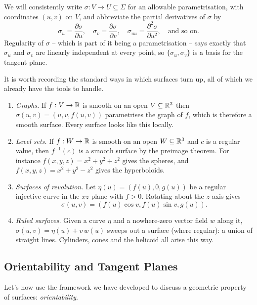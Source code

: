 \documentclass[a4paper]{scrartcl}
\begin{document}
We will consistently write $\sigma: V \rightarrow U \subseteq \Sigma$ for an allowable parametrisation, with coordinates $(u, v)$ on $V$, and abbreviate the partial derivatives of $\sigma$ by
$$
\sigma_u = \frac{\partial\sigma}{\partial u}, \quad \sigma_v = \frac{\partial\sigma}{\partial v}, \quad \sigma_{uu} = \frac{\partial^2 \sigma}{\partial u^2}, \quad \text{and so on.}
$$
Regularity of $\sigma$ -- which is part of it being a parametrisation -- says exactly that $\sigma_u$ and $\sigma_v$ are linearly independent at every point, so $\{\sigma_u, \sigma_v\}$ is a basis for the tangent plane.

It is worth recording the standard ways in which surfaces turn up, all of which we already have the tools to handle.

\begin{example}
    \begin{enumerate}[label=(\roman*)]
        \item \emph{Graphs.} If $f: V \rightarrow \mathbb{R}$ is smooth on an open $V\subseteq\mathbb{R}^2$ then $\sigma(u,v) = (u, v, f(u,v))$ parametrises the graph of $f$, which is therefore a smooth surface. Every surface looks like this locally.
        \item \emph{Level sets.} If $f: W \rightarrow \mathbb{R}$ is smooth on an open $W \subseteq \mathbb{R}^3$ and $c$ is a regular value, then $f^{-1}(c)$ is a smooth surface by the preimage theorem. For instance $f(x,y,z) = x^2+y^2+z^2$ gives the spheres, and $f(x,y,z) = x^2 + y^2 - z^2$ gives the hyperboloids.
        \item \emph{Surfaces of revolution.} Let $\eta(u) = (f(u), 0, g(u))$ be a regular injective curve in the $xz$-plane with $f > 0$. Rotating about the $z$-axis gives
        $$
        \sigma(u, v) = \left(f(u)\cos v, f(u) \sin v, g(u)\right).
        $$
        \item \emph{Ruled surfaces.} Given a curve $\eta$ and a nowhere-zero vector field $w$ along it, $\sigma(u,v) = \eta(u) + v\, w(u)$ sweeps out a surface (where regular): a union of straight lines. Cylinders, cones and the helicoid all arise this way.
    \end{enumerate}
\end{example}

\subsection{Orientability and Tangent Planes}

Let's now use the framework we have developed to discuss a geometric property of surfaces: \emph{orientability}.
\end{document}
